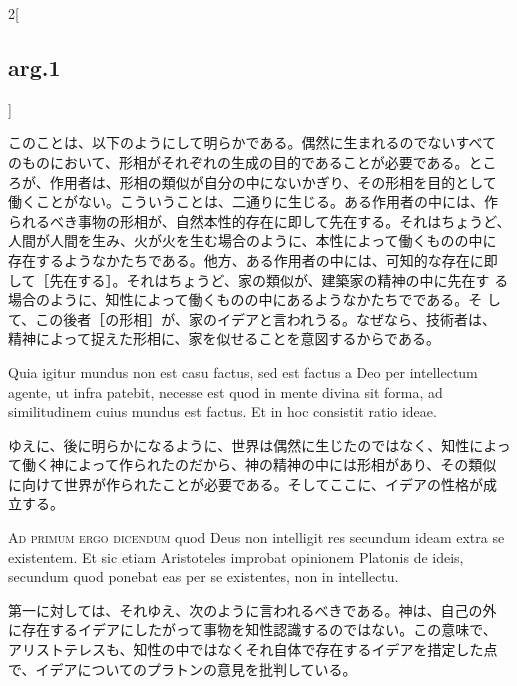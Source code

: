 \documentclass[paper=a4paper,fontsize=10pt,jafontsize=9pt,titlepage]{jlreq}
\begin{document}
\begin{paracol}{2}[\subsection{arg.1}]
\switchcolumn

このことは、以下のようにして明らかである。偶然に生まれるのでないすべて
のものにおいて、形相がそれぞれの生成の目的であることが必要である。とこ
ろが、作用者は、形相の類似が自分の中にないかぎり、その形相を目的として
働くことがない。こういうことは、二通りに生じる。ある作用者の中には、作
られるべき事物の形相が、自然本性的存在に即して先在する。それはちょうど、
人間が人間を生み、火が火を生む場合のように、本性によって働くものの中に
存在するようなかたちである。他方、ある作用者の中には、可知的な存在に即
して［先在する］。それはちょうど、家の類似が、建築家の精神の中に先在す
る場合のように、知性によって働くものの中にあるようなかたちでである。そ
して、この後者［の形相］が、家のイデアと言われうる。なぜなら、技術者は、
精神によって捉えた形相に、家を似せることを意図するからである。

\switchcolumn*

Quia igitur mundus non est casu factus, sed est factus a Deo per
intellectum agente, ut infra patebit, necesse est quod in mente divina
sit forma, ad similitudinem cuius mundus est factus. Et in hoc
consistit ratio ideae.

\switchcolumn

ゆえに、後に明らかになるように、世界は偶然に生じたのではなく、知性によっ
て働く神によって作られたのだから、神の精神の中には形相があり、その類似
に向けて世界が作られたことが必要である。そしてここに、イデアの性格が成
立する。

\switchcolumn*[\subsection{ad.1}]

{\scshape Ad primum ergo dicendum} quod Deus non intelligit res
secundum ideam extra se existentem. Et sic etiam Aristoteles improbat
opinionem Platonis de ideis, secundum quod ponebat eas per se
existentes, non in intellectu.

\switchcolumn

第一に対しては、それゆえ、次のように言われるべきである。神は、自己の外
に存在するイデアにしたがって事物を知性認識するのではない。この意味で、
アリストテレスも、知性の中ではなくそれ自体で存在するイデアを措定した点
で、イデアについてのプラトンの意見を批判している。

\switchcolumn*[\subsection{ad.2}]


\end{paracol}
\end{document}
